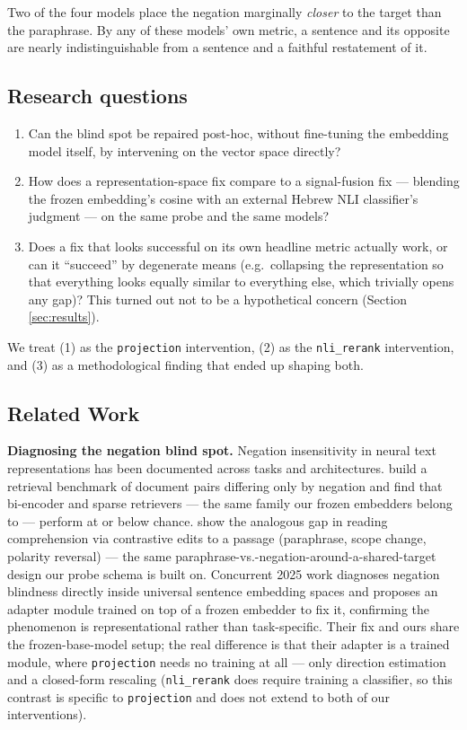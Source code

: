 \documentclass{article}
\begin{document}
Two of the four models place the negation marginally \emph{closer} to the
target than the paraphrase. By any of these models' own metric, a sentence
and its opposite are nearly indistinguishable from a sentence and a
faithful restatement of it.

\subsection*{Research questions}
\begin{enumerate}
\item Can the blind spot be repaired post-hoc, without fine-tuning the
  embedding model itself, by intervening on the vector space directly?
\item How does a representation-space fix compare to a signal-fusion fix
  --- blending the frozen embedding's cosine with an external Hebrew NLI
  classifier's judgment --- on the same probe and the same models?
\item Does a fix that looks successful on its own headline metric actually
  work, or can it ``succeed'' by degenerate means (e.g.\ collapsing the
  representation so that everything looks equally similar to everything
  else, which trivially opens any gap)? This turned out not to be a
  hypothetical concern (Section \ref{sec:results}).
\end{enumerate}

We treat (1) as the \texttt{projection} intervention, (2) as the
\texttt{nli\_rerank} intervention, and (3) as a methodological finding that
ended up shaping both.

\subsection{Related Work}

\textbf{Diagnosing the negation blind spot.} Negation insensitivity in
neural text representations has been documented across tasks and
architectures. \citet{weller2024nevir} build a retrieval benchmark of
document pairs differing only by negation and find that bi-encoder and
sparse retrievers --- the same family our frozen embedders belong to ---
perform at or below chance. \citet{ravichander2022condaqa} show the
analogous gap in reading comprehension via contrastive edits to a passage
(paraphrase, scope change, polarity reversal) --- the same paraphrase-vs.-negation-around-a-shared-target
design our probe schema is built on. Concurrent 2025 work
\citep{cao2025semanticadapter} diagnoses negation blindness directly inside
universal sentence embedding spaces and proposes an adapter module trained
on top of a frozen embedder to fix it, confirming the phenomenon is
representational rather than task-specific. Their fix and ours share the
frozen-base-model setup; the real difference is that their adapter is a
trained module, where \texttt{projection} needs no training at all --- only
direction estimation and a closed-form rescaling (\texttt{nli\_rerank} does
require training a classifier, so this contrast is specific to
\texttt{projection} and does not extend to both of our interventions).
\end{document}
